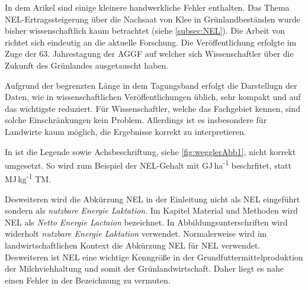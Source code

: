 In dem Arikel \parencite[33-36]{weggler2050leguminosen} sind einige kleinere handwerkliche Fehler enthalten.
Das Thema \ac{NEL}-Ertragssteigerung über die Nachsaat von Klee in Grünlandbeständen wurde bisher wissenschaftlich kaum betrachtet (siehe \cref{subsec:NEL}).
Die Arbeit von \textcite{weggler2050leguminosen} richtet sich eindeutig an die aktuelle Forschung.
Die Veröffentlichung erfolgte im Zuge der 63. Jahrestagung der \ac{AGGF} auf welcher sich Wissenschaftler über die Zukunft des Grünlandes ausgetauscht haben.

Aufgrund der begrenzten Länge in dem Tagungsband erfolgt die Darstellugn der Daten, wie in wissenschaftlichen Veröffentlichungen üblich, sehr kompakt und auf das wichtigste reduziert.
Für Wissenschaftler, welche das Fachgebiet kennen, sind solche Einschränkungen kein Problem.
Allerdings ist es insbesondere für Landwirte kaum möglich, die Ergebnisse korrekt zu interpretieren.

In \textcite[35]{weggler2050leguminosen} ist die Legende sowie Achsbeschriftung, siehe \cref{fig:wegglerAbb1}, nicht korrekt umgesetzt.
So wird zum Beispiel der \ac{NEL}-Gehalt mit GJ\,ha\textsuperscript{-1} beschrfitet, statt MJ\,kg\textsuperscript{-1} \ac{TM}.

Desweiteren wird die Abkürzung \ac{NEL} in der Einleitung nicht als \acl{NEL} eingeführt sondern als \textit{nutzbare Energie Laktation}.
Im Kapitel Material und Methoden wird \ac{NEL} als \textit{Netto Energie Lactaion} bezeichnet.
In Abbildungsunterschriften wird widerholt \textit{nutzbare Energie Laktation} verwendet.
Normalerweise wird im landwirtschaftlichen Kontext die Abkürzung \acs{NEL} für \acl{NEL} verwendet.
Desweiteren ist \ac{NEL} eine wichtige Kenngröße in der Grundfuttermittelproduktion der Milchviehhaltung und somit der Grünlandwirtschaft.
Daher liegt es nahe einen Fehler in der Bezeichnung zu vermuten.






